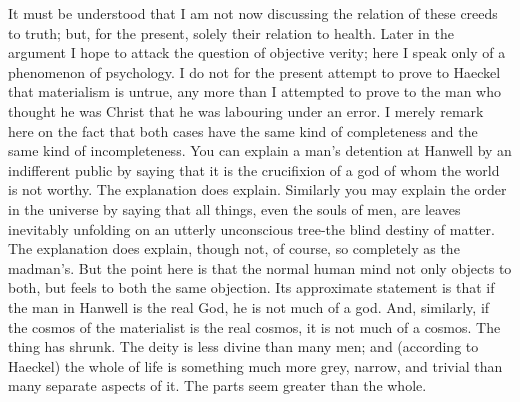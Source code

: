 \documentclass{book}
\begin{document}
It must be understood that I am not now discussing the relation of these creeds to truth; but, for the present, solely their relation to health. Later in the argument I hope to attack the question of objective verity; here I speak only of a phenomenon of psychology. I do not for the present attempt to prove to Haeckel that materialism is untrue, any more than I attempted to prove to the man who thought he was Christ that he was labouring under an error. I merely remark here on the fact that both cases have the same kind of completeness and the same kind of incompleteness. You can explain a man’s detention at Hanwell by an indifferent public by saying that it is the crucifixion of a god of whom the world is not worthy. The explanation does explain. Similarly you may explain the order in the universe by saying that all things, even the souls of men, are leaves inevitably unfolding on an utterly unconscious tree-the blind destiny of matter. The explanation does explain, though not, of course, so completely as the madman’s. But the point here is that the normal human mind not only objects to both, but feels to both the same objection. Its approximate statement is that if the man in Hanwell is the real God, he is not much of a god. And, similarly, if the cosmos of the materialist is the real cosmos, it is not much of a cosmos. The thing has shrunk. The deity is less divine than many men; and (according to Haeckel) the whole of life is something much more grey, narrow, and trivial than many separate aspects of it. The parts seem greater than the whole.
\end{document}
